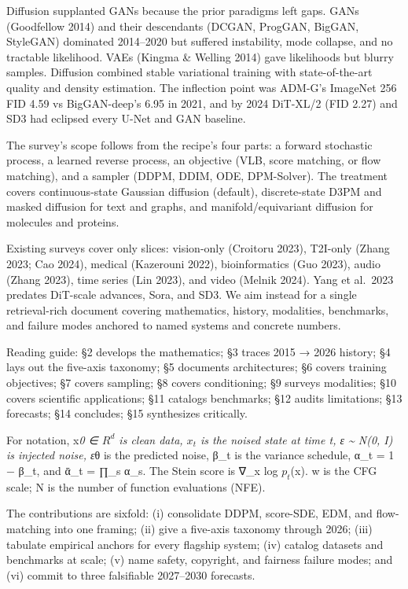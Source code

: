 Diffusion supplanted GANs because the prior paradigms left gaps. GANs (Goodfellow 2014) and their descendants (DCGAN, ProgGAN, BigGAN, StyleGAN) dominated 2014--2020 but suffered instability, mode collapse, and no tractable likelihood. VAEs (Kingma \& Welling 2014) gave likelihoods but blurry samples. Diffusion combined stable variational training with state-of-the-art quality and density estimation. The inflection point was ADM-G's ImageNet 256 FID 4.59 vs BigGAN-deep's 6.95 in 2021, and by 2024 DiT-XL/2 (FID 2.27) and SD3 had eclipsed every U-Net and GAN baseline.

The survey's scope follows from the recipe's four parts: a forward stochastic process, a learned reverse process, an objective (VLB, score matching, or flow matching), and a sampler (DDPM, DDIM, ODE, DPM-Solver). The treatment covers continuous-state Gaussian diffusion (default), discrete-state D3PM and masked diffusion for text and graphs, and manifold/equivariant diffusion for molecules and proteins.

Existing surveys cover only slices: vision-only (Croitoru 2023), T2I-only (Zhang 2023; Cao 2024), medical (Kazerouni 2022), bioinformatics (Guo 2023), audio (Zhang 2023), time series (Lin 2023), and video (Melnik 2024). Yang et al.~2023 predates DiT-scale advances, Sora, and SD3. We aim instead for a single retrieval-rich document covering mathematics, history, modalities, benchmarks, and failure modes anchored to named systems and concrete numbers.

Reading guide: §2 develops the mathematics; §3 traces 2015 → 2026 history; §4 lays out the five-axis taxonomy; §5 documents architectures; §6 covers training objectives; §7 covers sampling; §8 covers conditioning; §9 surveys modalities; §10 covers scientific applications; §11 catalogs benchmarks; §12 audits limitations; §13 forecasts; §14 concludes; §15 synthesizes critically.

For notation, x\emph{0 ∈ \(R^d\) is clean data, \(x_t\) is the noised state at time t, ε \textasciitilde{} N(0, I) is injected noise, ε}θ is the predicted noise, β\_t is the variance schedule, α\_t = 1 − β\_t, and ᾱ\_t = ∏\_s α\_s. The Stein score is ∇\_x log \(p_t\)(x). w is the CFG scale; N is the number of function evaluations (NFE).

The contributions are sixfold: (i) consolidate DDPM, score-SDE, EDM, and flow-matching into one framing; (ii) give a five-axis taxonomy through 2026; (iii) tabulate empirical anchors for every flagship system; (iv) catalog datasets and benchmarks at scale; (v) name safety, copyright, and fairness failure modes; and (vi) commit to three falsifiable 2027--2030 forecasts.

